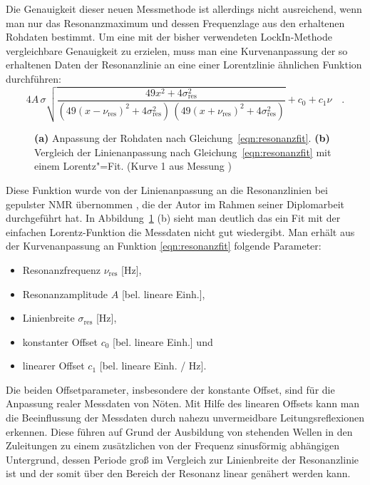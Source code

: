 Die Genauigkeit dieser neuen Messmethode ist allerdings nicht ausreichend, wenn man nur das Resonanzmaximum und dessen Frequenzlage aus den erhaltenen Rohdaten bestimmt. Um eine mit der bisher verwendeten LockIn-Methode vergleichbare Genauigkeit zu erzielen, muss man eine Kurvenanpassung der so erhaltenen Daten der Resonanzlinie an eine einer Lorentzlinie ähnlichen Funktion durchführen:
\begin{equation}
	4A\,\sigma\sqrt{\frac{49x^2 + 4\sigma_\text{res}^2}
	{\left(49\left(x-\nu_\text{res}\right)^2+4\sigma_\text{res}^2\right)
	\,\left(49\left(x+\nu_\text{res}\right)^2+4\sigma_\text{res}^2\right)}}
	+c_0+c_1\nu\quad.
	\label{eqn:resonanzfit}
\end{equation}
\begin{figure}[h!tbp]
	\centerline{%
	}%
	\caption[Linienanpassung an die Messdaten der Resonanzkurven]{{\bfseries (a)} Anpassung der Rohdaten nach Gleichung~\eqref{eqn:resonanzfit}. {\bfseries (b)} Vergleich der Linienanpassung nach Gleichung~\eqref{eqn:resonanzfit} mit einem Lorentz"=Fit. (Kurve 1 aus Messung )}
	\label{fig:fitvergleich}
\end{figure}
Diese Funktion wurde von der Linienanpassung an die Resonanzlinien bei gepulster NMR übernommen \cite{girgl}, die der Autor im Rahmen seiner Diplomarbeit durchgeführt hat. In Abbildung~\ref{fig:fitvergleich} (b) sieht man deutlich das ein Fit mit der einfachen Lorentz-Funktion die Messdaten nicht gut wiedergibt.
Man erhält aus der Kurvenanpassung an Funktion \eqref{eqn:resonanzfit} folgende Parameter:
\begin{itemize}
    \item Resonanzfrequenz $\nu_\text{res}$ [Hz],
    \item Resonanzamplitude $A$ [bel. lineare Einh.],
    \item Linienbreite $\sigma_\text{res}$ [Hz],
    \item konstanter Offset $c_0$ [bel. lineare Einh.] und
    \item linearer Offset $c_1$ [bel. lineare Einh. / Hz].
\end{itemize}
Die beiden Offsetparameter, insbesondere der konstante Offset, sind für die Anpassung realer Messdaten von Nöten. Mit Hilfe des linearen Offsets kann man die Beeinflussung der Messdaten durch nahezu unvermeidbare Leitungsreflexionen erkennen. Diese führen auf Grund der Ausbildung von stehenden Wellen in den Zuleitungen zu einem zusätzlichen von der Frequenz sinusförmig abhängigen Untergrund, dessen Periode groß im Vergleich zur Linienbreite der Resonanzlinie ist und der somit über den Bereich der Resonanz linear genähert werden kann. 

